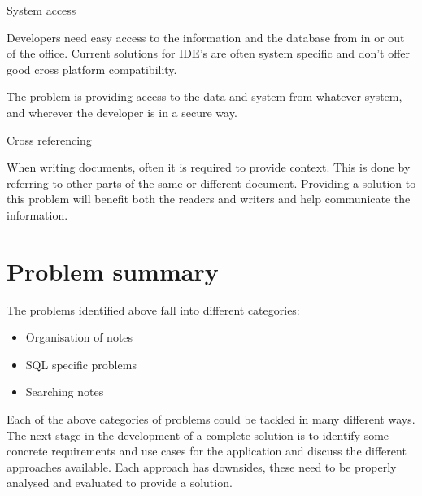 \begin{problem}{System access}

Developers need easy access to the information and the database from in or out
of the office. Current solutions for IDE's are often system specific and
don't offer good cross platform compatibility.

The problem is providing access to the data and system from whatever
system, and wherever the developer is in a secure way.
\end{problem}

\begin{problem}{Cross referencing}

When writing documents, often it is required to provide context. This is done
by referring to other parts of the same or different document. Providing a
solution to this problem will benefit both the readers and writers and help
communicate the information.

\end{problem}

\section{Problem summary}\label{summary-of-identified-problems}

The problems identified above fall into different categories:

\begin{itemize}
\tightlist
\item
  Organisation of notes
\item
  SQL specific problems
\item
  Searching notes
\end{itemize}

Each of the above categories of problems could be tackled in many different
ways. The next stage in the development of a complete solution is to identify
some concrete requirements and use cases for the application and discuss the
different approaches available. Each approach has downsides, these need to be
properly analysed and evaluated to provide a solution.
